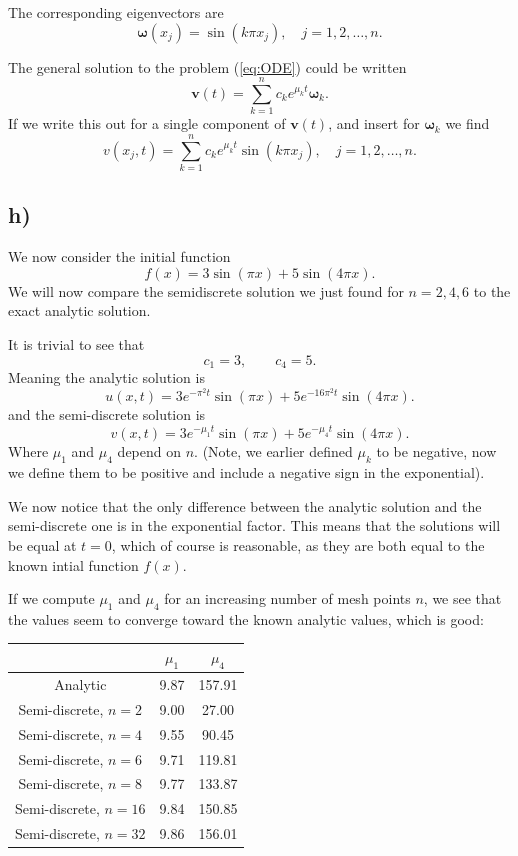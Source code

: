 \documentclass[a4paper, 11pt, notitlepage, english]{article}
\newcommand{\bt}[1]{\boldsymbol{#1}}
\begin{document}
The corresponding eigenvectors are
$$\bt{\omega}(x_j) = \sin(k\pi x_j), \quad j=1,2,\ldots,n.$$

The general solution to the problem (\ref{eq:ODE}) could be written
$$\bt{v}(t) = \sum_{k=1}^n c_k e^{\mu_k t} \bt{\omega}_k.$$
If we write this out for a single component of $\bt{v}(t)$, and insert for $\bt{\omega}_k$ we find
$$v(x_j, t) = \sum_{k=1}^n c_k e^{\mu_k t} \sin(k\pi x_j), \quad j=1,2,\ldots,n.$$

\subsection*{h)}
We now consider the initial function
$$f(x) = 3\sin(\pi x) + 5\sin(4\pi x).$$
We will now compare the semidiscrete solution we just found for $n=2,4,6$ to the exact analytic solution.

It is trivial to see that 
$$c_1 = 3, \qquad c_4 = 5.$$
Meaning the analytic solution is
$$u(x,t) = 3e^{-\pi^2 t}\sin(\pi x) + 5e^{-16\pi^2 t}\sin(4\pi x).$$
and the semi-discrete solution is
$$v(x,t) = 3e^{-\mu_1 t}\sin(\pi x) + 5e^{-\mu_4 t}\sin(4\pi x).$$
Where $\mu_1$ and $\mu_4$ depend on $n$. (Note, we earlier defined $\mu_k$ to be negative, now we define them to be positive and include a negative sign in the exponential).

We now notice that the only difference between the analytic solution and the semi-discrete one is in the exponential factor. This means that the solutions will be equal at $t=0$, which of course is reasonable, as they are both equal to the known intial function $f(x)$.

If we compute $\mu_1$ and $\mu_4$ for an increasing number of mesh points $n$, we see that the values seem to converge toward the known analytic values, which is good:

\begin{center}
    \begin{tabular}{c|c|c}
    & $\mu_1$ & $\mu_4$ \\ \hline
    Analytic &  9.87 & 157.91 \\ \hline \hline
    Semi-discrete, $n = 2$ & 9.00 & 27.00 \\ \hline
    Semi-discrete, $n = 4$ & 9.55 & 90.45 \\ \hline
    Semi-discrete, $n = 6$ & 9.71 & 119.81 \\ \hline
    Semi-discrete, $n = 8$ & 9.77 & 133.87 \\ \hline
    Semi-discrete, $n = 16$ & 9.84 & 150.85 \\ \hline
    Semi-discrete, $n = 32$ & 9.86 & 156.01 \\ \hline
        \end{tabular}
\end{center}
\end{document}
